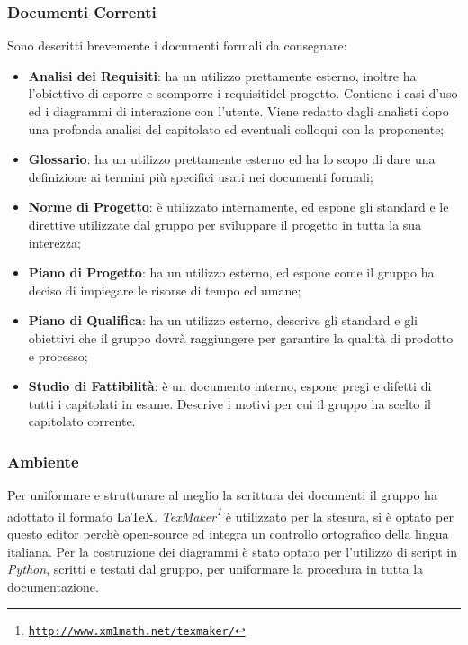 \subsubsection{Documenti Correnti}
\label{ProcessiSupporto_Documentazione_DocumentiCorrenti}
Sono descritti brevemente i documenti formali da consegnare:
\begin{itemize}
	\item \textbf{Analisi dei Requisiti}: ha un utilizzo prettamente esterno, inoltre ha l'obiettivo di esporre e scomporre i requisiti\glossario del progetto. Contiene i casi d'uso ed i diagrammi di interazione con l'utente. Viene redatto dagli analisti dopo una profonda analisi del capitolato ed eventuali colloqui con la proponente; 
	\item \textbf{Glossario}: ha un utilizzo prettamente esterno ed ha lo scopo di dare una definizione ai termini più specifici usati nei documenti formali;
	\item \textbf{Norme di Progetto}: è utilizzato internamente, ed espone gli standard e le direttive utilizzate dal gruppo per sviluppare il progetto in tutta la sua interezza;
	\item \textbf{Piano di Progetto}: ha un utilizzo esterno, ed espone come il gruppo ha deciso di impiegare le risorse di tempo ed umane;
	\item \textbf{Piano di Qualifica}: ha un utilizzo esterno, descrive gli standard e gli obiettivi che il gruppo dovrà raggiungere per garantire la qualità di prodotto e processo;
	\item \textbf{Studio di Fattibilità}: è un documento interno, espone pregi e difetti di tutti i capitolati in esame. Descrive i motivi per cui il gruppo ha scelto il capitolato corrente.
\end{itemize}

\subsubsection{Ambiente}\label{ProcessiSupporto_Documentazione_Ambiente} 
Per uniformare e strutturare al meglio la scrittura dei documenti il gruppo ha adottato il formato \LaTeX. 
\textit{TexMaker\footnote{\texttt{\url{http://www.xm1math.net/texmaker/}}}} è utilizzato per la stesura, si è optato per questo editor perchè open-source ed integra un controllo ortografico della lingua italiana. 
Per la costruzione dei diagrammi è stato optato per l'utilizzo di script in \textit{Python}, scritti e testati dal gruppo, per uniformare la procedura in tutta la documentazione.


